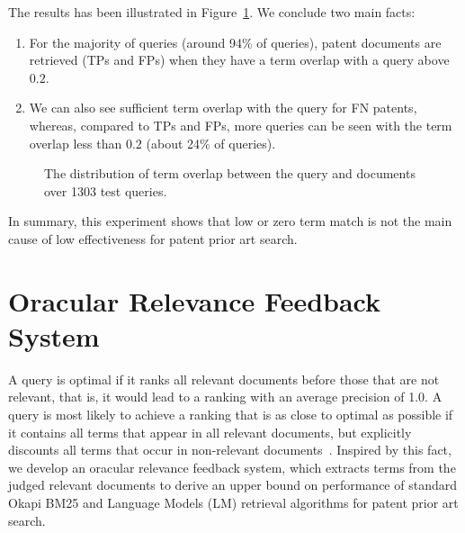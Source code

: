 The results has been illustrated in Figure~\ref{fig:overlap}. We conclude two main facts:
\begin{enumerate}
\item For the majority of queries (around 94\% of queries), patent documents are retrieved (TPs and FPs) when they have a term overlap with a query above $ 0.2 $.
\item We can also see sufficient term overlap with the query for FN patents, whereas, compared to TPs and FPs, more queries can be seen with the term overlap less than $ 0.2 $ (about 24\% of queries). 
\end{enumerate}
 
\begin{figure}[t!]
\begin{centering}
\par\end{centering}

\protect\caption{The distribution of term overlap between the query and documents over 1303 test queries.}
\label{fig:overlap}
\end{figure}
In summary, this experiment shows that low or zero term match is not the main cause of low effectiveness for patent prior art search.
\section{Oracular Relevance Feedback System}
\label{sec:oraculrquery}
A query is optimal if it ranks all relevant documents before
those that are not relevant, that is, it would lead to a ranking with an average precision of 1.0. A query
is most likely to achieve a ranking that is as close to optimal as possible if it contains all terms that
appear in all relevant documents, but explicitly discounts all terms that occur in non-relevant documents~\citep{manning2008introduction}.
Inspired by this fact, we develop an oracular relevance feedback system, which
extracts terms from the judged relevant documents to derive an upper bound on performance of
standard Okapi BM25 and Language Models (LM) retrieval
algorithms for patent prior art search.
